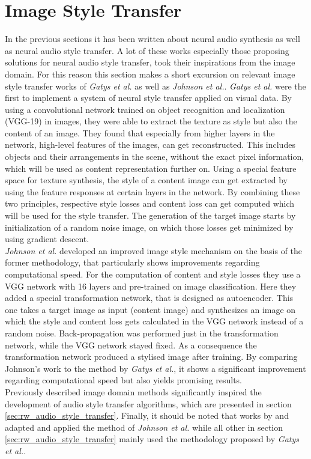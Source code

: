\section{Image Style Transfer}
\label{sec:rw_imgstyletransfer}
In the previous sections it has been written about neural audio synthesis as well as neural audio style transfer. A lot of these works especially those proposing solutions for neural audio style transfer, took their inspirations from the image domain. For this reason this section makes a short excursion on relevant image style transfer works of \textit{Gatys et al.} as well as \textit{Johnson et al.}. \cite{Gatys2016, johnson2016perceptual} \textit{Gatys et al.} were the first to implement a system of neural style transfer applied on visual data. By using a convolutional network trained on object recognition and localization (VGG-19) in images, they were able to extract the texture as style but also the content of an image. They found that especially from higher layers in the network, high-level features of the images, can get reconstructed. This includes objects and their arrangements in the scene, without the exact pixel information, which will be used as content representation further on. Using a special feature space for texture synthesis, the style of a content image can get extracted by using the feature responses at certain layers in the network. By combining these two principles, respective style losses and content loss can get computed which will be used for the style transfer. The generation of the target image starts by initialization of a random noise image, on which those losses get minimized by using gradient descent.\\
\textit{Johnson et al.} developed an improved image style mechanism on the basis of the former methodology, that particularly shows improvements regarding computational speed. For the computation of content and style losses they use a VGG network with 16 layers and pre-trained on image classification. Here they added a special transformation network, that is designed as autoencoder. This one takes a target image as input (content image) and synthesizes an image on which the style and content loss gets calculated in the VGG network instead of a random noise. Back-propagation was performed just in the transformation network, while the VGG network stayed fixed. As a consequence the transformation network produced a stylised image after training. By comparing Johnson's work to the method by \textit{Gatys et al.}, it shows a significant improvement regarding computational speed but also yields promising results.\\
Previously described image domain methods significantly inspired the development of audio style transfer algorithms, which are presented in section \ref{sec:rw_audio_style_transfer}. Finally, it should be noted that works by \cite{Ramani2018} and \cite{Liu2019} adapted and applied the method of \textit{Johnson et al.} while all other in section \ref{sec:rw_audio_style_transfer} mainly used the methodology proposed by \textit{Gatys et al.}.